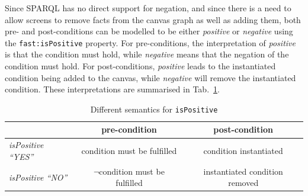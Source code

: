 \documentclass[twoside]{fast_latex}
\begin{document}
Since SPARQL has no direct support for negation, and since there is a need to allow screens to remove facts from the canvas graph as well as adding them, both pre- and post-conditions can be modelled to be either \emph{positive} or \emph{negative} using the \texttt{fast:isPositive} property. For pre-conditions, the interpretation of \emph{positive} is that the condition must hold, while \emph{negative} means that the negation of the condition must hold. For post-conditions, \emph{positive} leads to the instantiated condition being added to the canvas, while \emph{negative} will remove the instantiated condition. These interpretations are summarised in Tab.~\ref{tab:is_positive}.

\begin{table}[ht]
	\caption{Different semantics for \texttt{isPositive}}
	\label{tab:is_positive}
	\begin{center}
		
		\begin{tabular}{lcc}
			\toprule
			& \textbf{pre-condition} & \textbf{post-condition} \\ 
			\midrule
			\emph{isPositive ``YES''} & condition must be fulfilled & condition instantiated\\ 
			\emph{isPositive ``NO''} & $\neg$condition must be fulfilled & instantiated condition removed \\ 
			\bottomrule
		\end{tabular}
	\end{center}
\end{table}


% 
% 
% 
% 
% 
% 
% 
% 
% 
\end{document}
